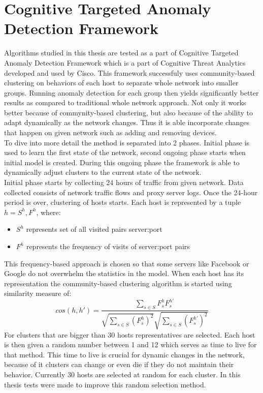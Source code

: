 \documentclass[thesis=B,english]{FITthesis}[2012/10/20]
\begin{document}
\section{Cognitive Targeted Anomaly Detection Framework}

Algorithms studied in this thesis are tested as a part of Cognitive Targeted Anomaly Detection Framework which is a part of Cognitive Threat Analytics developed and used by Cisco.
This framework successfuly uses community-based clustering on behaviors of each host to separate whole network into smaller groups.
Running anomaly detection for each group then yields significantly better results as compared to traditional whole network approach.
Not only it works better because of commynity-based clustering, but also because of the ability to adapt dynamically as the network changes.
Thus it is able incorporate changes that happen on given network such as adding and removing devices.\\

To dive into more detail the method is separated into 2 phases.
Initial phase is used to learn the first state of the network, second ongoing phase starts when initial model is created.
During this ongoing phase the framework is able to dynamically adjust clusters to the current state of the network. \\

Initial phase starts by collecting 24 hours of traffic from given network.
Data collected consists of network traffic flows and proxy server logs.
Once the 24-hour period is over, clustering of hosts starts.
Each host is represented by a tuple $h = {S^h, F^h}$, where:
\begin{itemize}
    \item $S^h$ represents set of all visited pairs server:port
    \item $F^h$ represents the frequency of visits of server:port pairs
\end{itemize}
This frequency-based approach is chosen so that some servers like Facebook or Google do not overwhelm the statistics in the model.
When each host has its representation the community-based clustering algorithm is started using similarity measure of:
$$cos(h, h') = \frac{\sum_{s \in S} F_s^h F_s^{h'}} {\sqrt{\sum_{s \in S} (F_s^h)^2} \sqrt{\sum_{s \in S} (F_s^{h'})^2}}$$
For clusters that are bigger than 30 hosts representatives are selected. %
Each host is then given a random number between 1 and 12 which serves as time to live for that method. %
This time to live is crucial for dynamic changes in the network, because of it clusters can change or even die if they do not maintain their behavior.
Currently 30 hosts are selected at random for each cluster.
In this thesis tests were made to improve this random selection method.
\end{document}
